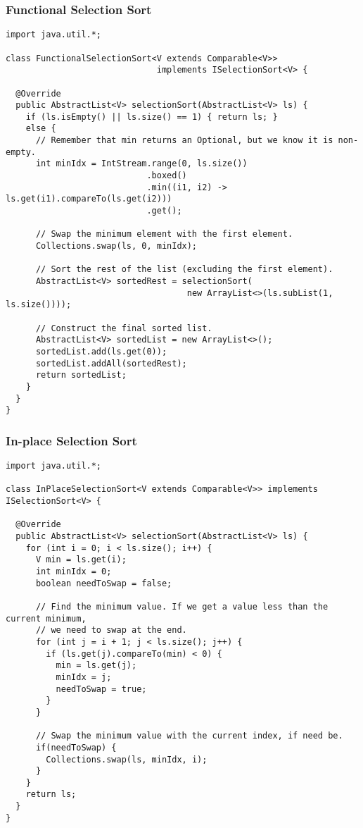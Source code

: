 \subsubsection*{Functional Selection Sort}
\begin{lstlisting}[language=MyJava]
import java.util.*;

class FunctionalSelectionSort<V extends Comparable<V>> 
                              implements ISelectionSort<V> {

  @Override
  public AbstractList<V> selectionSort(AbstractList<V> ls) {
    if (ls.isEmpty() || ls.size() == 1) { return ls; }
    else {
      // Remember that min returns an Optional, but we know it is non-empty.
      int minIdx = IntStream.range(0, ls.size())
                            .boxed()
                            .min((i1, i2) -> ls.get(i1).compareTo(ls.get(i2)))
                            .get();

      // Swap the minimum element with the first element.
      Collections.swap(ls, 0, minIdx);

      // Sort the rest of the list (excluding the first element).
      AbstractList<V> sortedRest = selectionSort(
                                    new ArrayList<>(ls.subList(1, ls.size())));

      // Construct the final sorted list.
      AbstractList<V> sortedList = new ArrayList<>();
      sortedList.add(ls.get(0));
      sortedList.addAll(sortedRest);
      return sortedList;
    }
  }
}
\end{lstlisting}

\subsubsection*{In-place Selection Sort}
\begin{lstlisting}[language=MyJava]
import java.util.*;

class InPlaceSelectionSort<V extends Comparable<V>> implements ISelectionSort<V> {
  
  @Override
  public AbstractList<V> selectionSort(AbstractList<V> ls) {
    for (int i = 0; i < ls.size(); i++) {
      V min = ls.get(i);
      int minIdx = 0;
      boolean needToSwap = false;

      // Find the minimum value. If we get a value less than the current minimum,
      // we need to swap at the end.
      for (int j = i + 1; j < ls.size(); j++) {
        if (ls.get(j).compareTo(min) < 0) {
          min = ls.get(j);
          minIdx = j;
          needToSwap = true;
        }
      }

      // Swap the minimum value with the current index, if need be.
      if(needToSwap) { 
        Collections.swap(ls, minIdx, i); 
      }
    }
    return ls;
  }
}
\end{lstlisting}  

